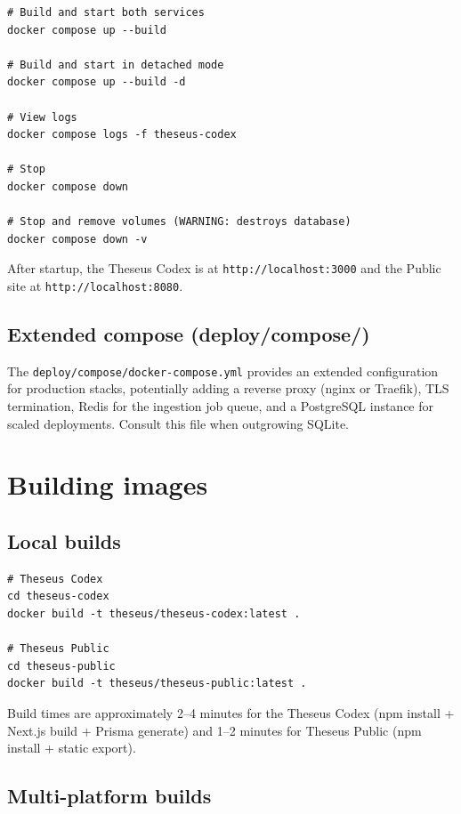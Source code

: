 \documentclass[11pt,letterpaper]{article}
\newcommand{\file}[1]{\texttt{#1}}
\newcommand{\cmd}[1]{\texttt{#1}}
\begin{document}
\begin{lstlisting}
# Build and start both services
docker compose up --build

# Build and start in detached mode
docker compose up --build -d

# View logs
docker compose logs -f theseus-codex

# Stop
docker compose down

# Stop and remove volumes (WARNING: destroys database)
docker compose down -v
\end{lstlisting}

After startup, the Theseus Codex is at \cmd{http://localhost:3000} and the Public site at \cmd{http://localhost:8080}.

\subsection{Extended compose (deploy/compose/)}

The \file{deploy/compose/docker-compose.yml} provides an extended configuration for production stacks, potentially adding a reverse proxy (nginx or Traefik), TLS termination, Redis for the ingestion job queue, and a PostgreSQL instance for scaled deployments. Consult this file when outgrowing SQLite.

\section{Building images}

\subsection{Local builds}

\begin{lstlisting}
# Theseus Codex
cd theseus-codex
docker build -t theseus/theseus-codex:latest .

# Theseus Public
cd theseus-public
docker build -t theseus/theseus-public:latest .
\end{lstlisting}

Build times are approximately 2--4 minutes for the Theseus Codex (npm install + Next.js build + Prisma generate) and 1--2 minutes for Theseus Public (npm install + static export).

\subsection{Multi-platform builds}
\end{document}
